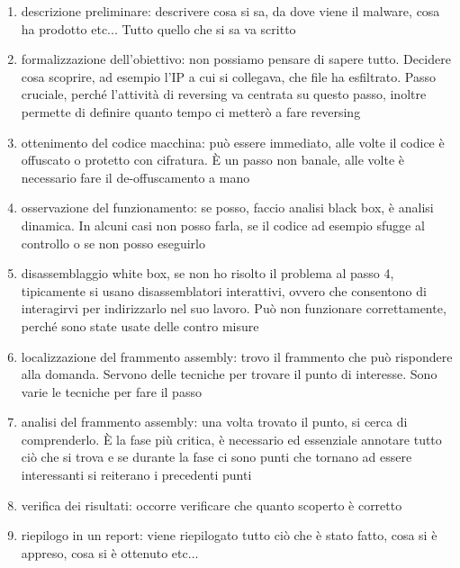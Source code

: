 \documentclass[12pt, oneside]{extbook}
\begin{document}
\begin{enumerate}
\item descrizione preliminare: descrivere cosa si sa, da dove viene il malware, cosa ha prodotto etc... Tutto quello che si sa va scritto
\item formalizzazione dell'obiettivo: non possiamo pensare di sapere tutto. Decidere cosa scoprire, ad esempio l'IP a cui si collegava, che file ha esfiltrato. Passo cruciale, perché l'attività di reversing va centrata su questo passo, inoltre permette di definire quanto tempo ci metterò a fare reversing
\item ottenimento del codice macchina: può essere immediato, alle volte il codice è offuscato o protetto con cifratura. È un passo non banale, alle volte è necessario fare il de-offuscamento a mano
\item osservazione del funzionamento: se posso, faccio analisi black box, è analisi dinamica. In alcuni casi non posso farla, se il codice ad esempio sfugge al controllo o se non posso eseguirlo
\item disassemblaggio white box, se non ho risolto il problema al passo 4, tipicamente si usano disassemblatori interattivi, ovvero che consentono di interagirvi per indirizzarlo nel suo lavoro. Può non funzionare correttamente, perché sono state usate delle contro misure
\item localizzazione del frammento assembly: trovo il frammento che può rispondere alla domanda. Servono delle tecniche per trovare il punto di interesse. Sono varie le tecniche per fare il passo
\item analisi del frammento assembly: una volta trovato il punto, si cerca di comprenderlo. È la fase più critica, è necessario ed essenziale annotare tutto ciò che si trova e se durante la fase ci sono punti che tornano ad essere interessanti si reiterano i precedenti punti
\item verifica dei risultati: occorre verificare che quanto scoperto è corretto
\item riepilogo in un report: viene riepilogato tutto ciò che è stato fatto, cosa si è appreso, cosa si è ottenuto etc...
\end{enumerate}
\end{document}
